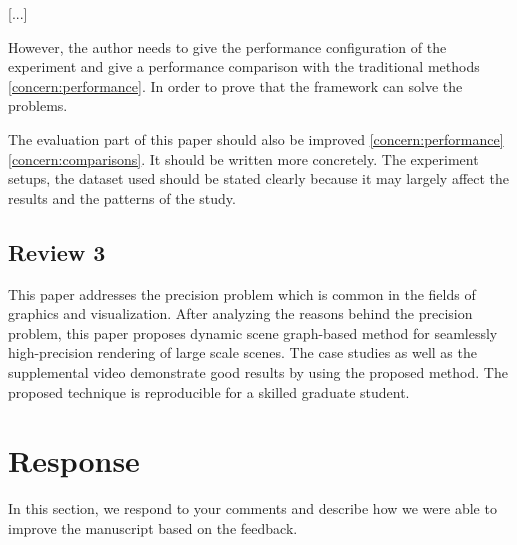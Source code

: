\documentclass{article}
\begin{document}
[...]

However, the author needs to give the performance configuration of the experiment and give a performance comparison with the traditional methods \eqref{concern:performance}. 
In order to prove that the framework can solve the problems.
    
The evaluation part of this paper should also be improved \eqref{concern:performance} \eqref{concern:comparisons}.
It should be written more concretely.
The experiment setups, the dataset used should be stated clearly because it may largely affect the results and the patterns of the study.

\subsection*{Review 3}

This paper addresses the precision problem which is common in the fields of graphics and visualization.
After analyzing the reasons behind the precision problem, this paper proposes dynamic scene graph-based method for seamlessly high-precision rendering of large scale scenes.
The case studies as well as the supplemental video demonstrate good results by using the proposed method.
The proposed technique is reproducible for a skilled graduate student.



\section{Response}
In this section, we respond to your comments and describe how we were able to improve the manuscript based on the feedback.





\end{document}

